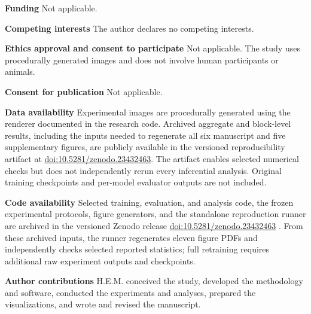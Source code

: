\documentclass[pdflatex,sn-basic]{sn-jnl}
\begin{document}
\textbf{Funding} Not applicable.

\textbf{Competing interests} The author declares no competing interests.

\textbf{Ethics approval and consent to participate} Not applicable. The study uses procedurally generated images and does not involve human participants or animals.

\textbf{Consent for publication} Not applicable.

\textbf{Data availability} Experimental images are procedurally generated using the renderer documented in the research code. Archived aggregate and block-level results, including the inputs needed to regenerate all six manuscript and five supplementary figures, are publicly available in the versioned reproducibility artifact at \href{https://doi.org/10.5281/zenodo.23432463}{doi:10.5281/zenodo.23432463}. The artifact enables selected numerical checks but does not independently rerun every inferential analysis. Original training checkpoints and per-model evaluator outputs are not included.

\textbf{Code availability} Selected training, evaluation, and analysis code, the frozen experimental protocols, figure generators, and the standalone reproduction runner are archived in the versioned Zenodo release \href{https://doi.org/10.5281/zenodo.23432463}{doi:10.5281/zenodo.23432463} \citep{espino_2026_activation_patching_artifact}. From these archived inputs, the runner regenerates eleven figure PDFs and independently checks selected reported statistics; full retraining requires additional raw experiment outputs and checkpoints.

\textbf{Author contributions} H.E.M. conceived the study, developed the methodology and software, conducted the experiments and analyses, prepared the visualizations, and wrote and revised the manuscript.


\end{document}
